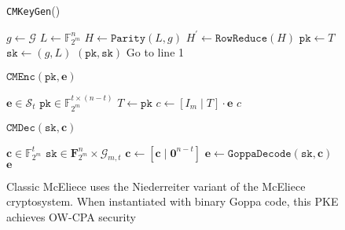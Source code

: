 \documentclass[runningheads]{llncs}
\newcommand{\pk}{\texttt{pk}}
\newcommand{\sk}{\texttt{sk}}
\begin{document}
\begin{figure}[h]
    \centering

    \begin{minipage}[t]{0.32\textwidth}
        \begin{algorithm}[H]
            \caption*{\texttt{CMKeyGen}()}
            \begin{algorithmic}[1]
                    \State $g \leftarrow \mathcal{G}$
                    \State $L \leftarrow \mathbb{F}_{2^m}^n$
                    \State $H \leftarrow \texttt{Parity}(L, g)$
                    \State $H^\prime \leftarrow \texttt{RowReduce}(H)$
                        \State $\pk \leftarrow T$
                        \State $\sk \leftarrow (g, L)$
                        \State \Return $(\pk, \sk)$
                    \EndIf
                    \State Go to line 1
            \end{algorithmic}
        \end{algorithm}
    \end{minipage}\hfill
    \begin{minipage}[t]{0.32\textwidth}
        \begin{algorithm}[H]
            \caption*{$\texttt{CMEnc}(\pk, \mathbf{e})$}
            \begin{algorithmic}[1]
                \Require $\mathbf{e} \in \mathcal{S}_t$
                \Require $\pk \in \mathbb{F}_{2^m}^{t \times (n - t)}$
                \State $T \leftarrow \pk$
                \State $c \leftarrow [I_m \mid T] \cdot \mathbf{e}$
                \State \Return $c$
            \end{algorithmic}
        \end{algorithm}
    \end{minipage}\hfill
    \begin{minipage}[t]{0.33\textwidth}
        \begin{algorithm}[H]
            \caption*{$\texttt{CMDec}(\sk, \mathbf{c})$}
            \begin{algorithmic}[1]
                \Require $\mathbf{c} \in \mathbb{F}_{2^m}^t$
                \Require $\sk \in \mathbf{F}_{2^m}^n \times \mathcal{G}_{m,t}$
                \State $\mathbf{c} \leftarrow [\mathbf{c} \mid \mathbf{0}^{n-t}]$
                \State $\mathbf{e} \leftarrow \texttt{GoppaDecode}(\sk, \mathbf{c})$
                \State \Return $\mathbf{e}$
            \end{algorithmic}
        \end{algorithm}
    \end{minipage}
    \caption{Classic McEliece uses the Niederreiter variant of the McEliece cryptosystem. When instantiated with binary Goppa code, this PKE achieves OW-CPA security}\label{fig:mceliece-pke}
\end{figure}
\end{document}
